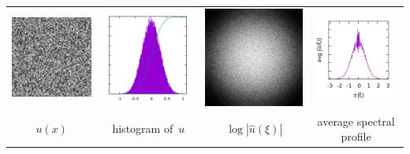 \begin{tabular}{cccc}
	\includegraphics{b256.png} &
	\includegraphics{b256_h.png} &
	\includegraphics{b256_f.png} &
	\includegraphics{b256_p.png} \\
	$u(x)$ &
	histogram of~$u$ &
	$\log|\hat u(\xi)|$ &
	average spectral profile
\end{tabular}
